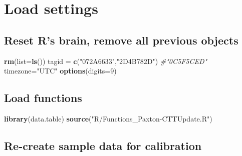 \documentclass[
]{book}
\newenvironment{Shaded}{\begin{snugshade}}{\end{snugshade}}
\newcommand{\AttributeTok}[1]{\textcolor[rgb]{0.13,0.29,0.53}{#1}}
\newcommand{\CommentTok}[1]{\textcolor[rgb]{0.56,0.35,0.01}{\textit{#1}}}
\newcommand{\DecValTok}[1]{\textcolor[rgb]{0.00,0.00,0.81}{#1}}
\newcommand{\FunctionTok}[1]{\textcolor[rgb]{0.13,0.29,0.53}{\textbf{#1}}}
\newcommand{\NormalTok}[1]{#1}
\newcommand{\OtherTok}[1]{\textcolor[rgb]{0.56,0.35,0.01}{#1}}
\newcommand{\StringTok}[1]{\textcolor[rgb]{0.31,0.60,0.02}{#1}}
\begin{document}
\section{Load settings}\label{load-settings-4}

\subsection{Reset R's brain, remove all previous objects}\label{reset-rs-brain-remove-all-previous-objects}

\begin{Shaded}
\begin{Highlighting}[]
\FunctionTok{rm}\NormalTok{(}\AttributeTok{list=}\FunctionTok{ls}\NormalTok{())}
\NormalTok{tagid }\OtherTok{=} \FunctionTok{c}\NormalTok{(}\StringTok{"072A6633"}\NormalTok{,}\StringTok{"2D4B782D"}\NormalTok{) }\CommentTok{\#"0C5F5CED"}
\NormalTok{timezone}\OtherTok{=}\StringTok{"UTC"}
\FunctionTok{options}\NormalTok{(}\AttributeTok{digits=}\DecValTok{9}\NormalTok{)}
\end{Highlighting}
\end{Shaded}

\subsection{Load functions}\label{load-functions-3}

\begin{Shaded}
\begin{Highlighting}[]
\FunctionTok{library}\NormalTok{(data.table)}
\FunctionTok{source}\NormalTok{(}\StringTok{"R/Functions\_Paxton{-}CTTUpdate.R"}\NormalTok{)}
\end{Highlighting}
\end{Shaded}

\subsection{Re-create sample data for calibration}\label{re-create-sample-data-for-calibration}
\end{document}
